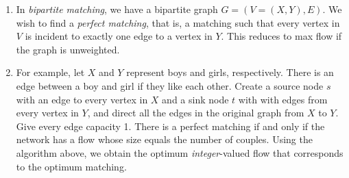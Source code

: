 \documentclass[10pt]{article}
\begin{document}
\begin{multicols}{2}
\begin{addmargin}[0.8em]{0.5em}
\begin{enumerate}[label=(\alph*)]
        \item In \textit{bipartite matching}, we have a bipartite graph $G=(V=(X,Y),E)$. We wish to find a \textit{perfect matching}, that is, a matching such that every vertex in $V$ is incident to exactly one edge to a vertex in $Y$. This reduces to max flow if the graph is unweighted. 
        
        \item For example, let $X$ and $Y$ represent boys and girls, respectively. There is an edge between a boy and girl if they like each other. Create a source node $s$ with an edge to every vertex in $X$ and a sink node $t$ with with edges from every vertex in $Y$, and direct all the edges in the original graph from $X$ to $Y$. Give every edge capacity 1. There is a perfect matching if and only if the network has a flow whose size equals the number of couples. Using the algorithm above, we obtain the optimum \textit{integer}-valued flow that corresponds to the optimum matching.
    \end{enumerate}
    
    \vspace{-0.4cm}

\end{addmargin}
\end{multicols}
\end{document}
